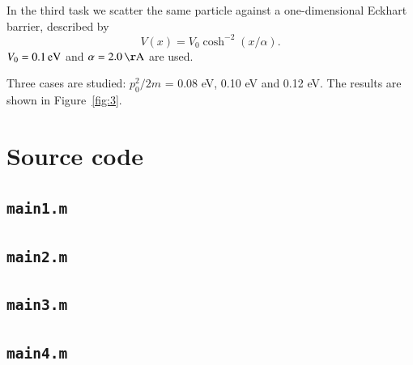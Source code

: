 In the third task we scatter the same particle against a one-dimensional Eckhart barrier, described by
\begin{equation}
V(x) = V_0 \cosh^{-2} (x/\alpha).
\end{equation}
$V_0 = \unit[0.1]{eV}$ and $\alpha = \unit[2.0]{\AA}$ are used.

Three cases are studied: $p_0^2/2m$ = 0.08 eV, 0.10 eV and 0.12 eV. The results are shown in Figure~\ref{fig:3}.








\appendix
\section{Source code}

\subsection{\texttt{main1.m}}


\subsection{\texttt{main2.m}}


\subsection{\texttt{main3.m}}


\subsection{\texttt{main4.m}}




